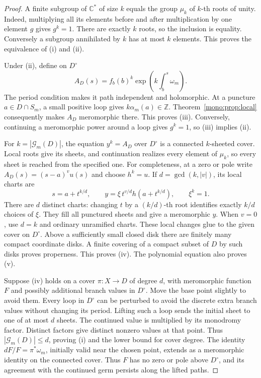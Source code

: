 \begin{proof}
A finite subgroup of \(\mathbb C^*\) of size \(k\) equals the group
\(\mu_k\) of \(k\)-th roots of unity.
Indeed, multiplying all its elements before and after multiplication
by one element \(g\) gives \(g^k=1\).
There are exactly \(k\) roots, so the inclusion is equality.
Conversely a subgroup annihilated by \(k\) has at most \(k\) elements.
This proves the equivalence of (i) and (ii).

Under (ii), define on \(D^\circ\)
\[
 A_D(s)=f_b(b)^k\exp\left(k\int_b^s\omega_m\right).
\]
The period condition makes it path independent and holomorphic.
At a puncture \(a\in D\cap S_m\), a small positive loop gives
\(k\alpha_m(a)\in\mathbb Z\).
Theorem~\ref{mono:prop:local} consequently makes \(A_D\) meromorphic there.
This proves (iii).  Conversely, continuing a meromorphic power around a
loop gives \(g^k=1\), so (iii) implies (ii).

For \(k=|\mathcal G_m(D)|\), the equation \(y^k=A_D\) over \(D^\circ\)
is a connected \(k\)-sheeted cover.
Local roots give its sheets, and continuation realizes every element
of \(\mu_k\), so every sheet is reached from the specified one.
For completeness, at a zero or pole write
\(A_D(s)=(s-a)^v u(s)\) and choose \(h^k=u\).
If \(d=\gcd(k,|v|)\), its local charts are
\[
 s=a+t^{k/d},\qquad
 y=\xi\,t^{v/d}h(a+t^{k/d}),\qquad \xi^k=1.
\]
There are \(d\) distinct charts: changing \(t\) by a \((k/d)\)-th
root identifies exactly \(k/d\) choices of \(\xi\).
They fill all punctured sheets and give a meromorphic \(y\).
When \(v=0\), use \(d=k\) and ordinary unramified charts.
These local changes glue to the given cover on \(D^\circ\).
Above a sufficiently small closed disk there are finitely many compact
coordinate disks.  A finite covering of a compact subset of \(D\)
by such disks proves properness.  This proves (iv).
The polynomial equation also proves (v).

Suppose (iv) holds on a cover \(\pi:X\to D\) of degree \(d\),
with meromorphic function \(F\) and possibly additional branch values
in \(D^\circ\).
Move the base point slightly to avoid them.
Every loop in \(D^\circ\) can be perturbed to avoid the discrete extra
branch values without changing its period.
Lifting such a loop sends the initial sheet to one of at most \(d\) sheets.
The continued value is multiplied by its monodromy factor.
Distinct factors give distinct nonzero values at that point.
Thus \(|\mathcal G_m(D)|\leq d\), proving (i) and the lower bound for cover degree.
The identity \(dF/F=\pi^*\omega_m\), initially valid near the chosen
point, extends as a meromorphic identity on the connected cover.
Thus \(F\) has no zero or pole above \(D^\circ\), and its agreement
with the continued germ persists along the lifted paths.


\end{proof}
